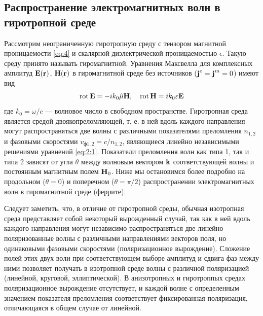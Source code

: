 \subsection{Распространение электромагнитных волн в гиротропной среде}
Рассмотрим неограниченную гиротропную среду с тензором магнитной проницаемости \eqref{eq:4} и скалярной диэлектрической
проницаемостью $\epsilon$. Такую среду принято называть гиромагнитной. Уравнения Максвелла для комплексных амплитуд
$\textbf{E}(\textbf{r})$, $\textbf{H}(\textbf{r})$ в гиромагнитной среде без источников ($\textbf{j}^e = \textbf{j}^m=0$) имеют вид
\begin{equation}
    \operatorname{rot} \textbf{E}=-i k_{0} \hat{\mu} \textbf{H}, \quad \operatorname{rot} \textbf{H}=i k_{0} \varepsilon \textbf{E}
    \label{eq:2:1}
\end{equation}
где $k_0 = \omega /c$ — волновое число в свободном пространстве. Гиротропная среда является средой двоякопреломляющей, т. е. в
ней вдоль каждого направления могут распространяться две волны с различными показателями преломления $n_{1,2}$ и фазовыми
скоростями $v_{\text{ф}1,2} = c/n_{1,2}$, являющиеся линейно независимыми решениями уравнений \eqref{eq:2:1}. Показатели преломления волн как
типа 1, так и типа 2 зависят от угла $\theta$ между волновым вектором $\textbf{k}$ соответствующей волны и постоянным магнитным полем $\textbf{H}_0$.
Ниже мы остановимся более подробно на продольном ($\theta=0$) и поперечном ($\theta=\pi/2$) распространении электромагнитных волн в
гиромагнитной среде (феррите).

Следует заметить, что, в отличие от гиротропной среды, обычная изотропная среда представляет собой некоторый вырожденный
случай, так как в ней вдоль каждого направления могут независимо распространяться две линейно поляризованные волны с
различными направлениями векторов поля, но одинаковыми фазовыми скоростями (поляризационное вырождение).
Сложение полей этих двух воли при соответствующем выборе амплитуд и сдвига фаз между ними позволяет получать в
изотропной среде волны с различной поляризацией (линейной, круговой, эллиптической).
В анизотропных и гиротроппых средах поляризационное вырождение отсутствует, и каждой волне с определенным значением
показателя преломления соответствует фиксированная поляризация, отличающаяся в общем случае от линейной.

